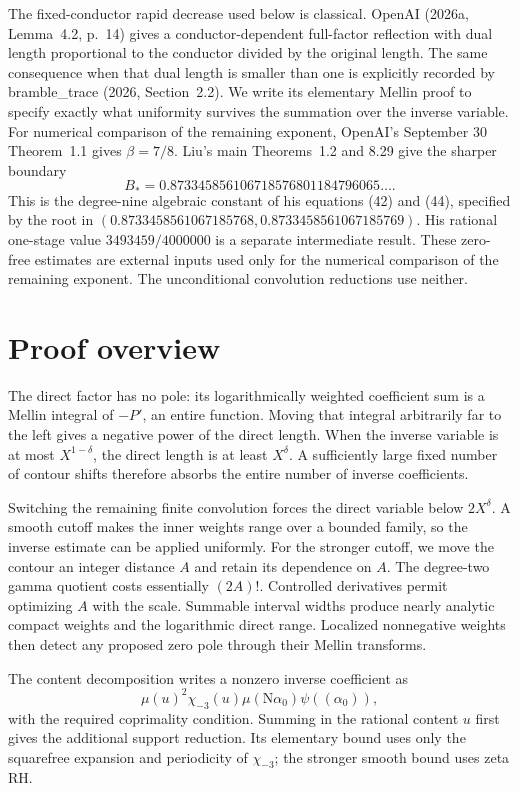 \documentclass[11pt]{article}
\newcommand{\N}{\mathrm N}
\begin{document}
The fixed-conductor rapid decrease used below is classical.
OpenAI (2026a, Lemma~4.2, p.~14) gives a conductor-dependent
full-factor reflection with dual length proportional to the conductor
divided by the original length. The same consequence when that dual
length is smaller than one is explicitly recorded by
bramble\_trace (2026, Section~2.2).
We write its elementary Mellin proof to specify exactly what
uniformity survives the summation over the inverse variable.
For numerical comparison of the remaining exponent, OpenAI's
September 30 Theorem~1.1 gives $\beta=7/8$.
Liu's main Theorems~1.2 and 8.29 give the sharper boundary
\[
 B_*=0.873345856106718576801184796065\ldots.
\]
This is the degree-nine algebraic constant of his equations (42)
and (44), specified by the root in
$(0.8733458561067185768,0.8733458561067185769)$.
His rational one-stage value $3493459/4000000$ is a separate
intermediate result.
These zero-free estimates are external inputs used only for the numerical
comparison of the remaining exponent. The unconditional convolution
reductions use neither.

\section*{Proof overview}
The direct factor has no pole: its logarithmically weighted
coefficient sum is a Mellin integral of $-P'$, an entire function.
Moving that integral arbitrarily far to the left gives a negative
power of the direct length. When the inverse variable is at most
$X^{1-\delta}$, the direct length is at least $X^\delta$.
A sufficiently large fixed number of contour shifts therefore
absorbs the entire number of inverse coefficients.

Switching the remaining finite convolution forces the direct variable
below $2X^\delta$. A smooth cutoff makes the inner weights range
over a bounded family, so the inverse estimate can be applied uniformly.
For the stronger cutoff, we move the contour an integer distance $A$ and retain its dependence on $A$. The degree-two gamma quotient costs essentially $(2A)!$. Controlled derivatives permit optimizing $A$ with the scale. Summable interval widths produce nearly analytic compact weights and the logarithmic direct range. Localized nonnegative weights then detect any proposed zero pole through their Mellin transforms.

The content decomposition writes a nonzero inverse coefficient as
\[
 \mu(u)^2\chi_{-3}(u)\mu(\N\alpha_0)\psi((\alpha_0)),
\]
with the required coprimality condition. Summing in the rational
content $u$ first gives the additional support reduction.
Its elementary bound uses only the squarefree expansion and
periodicity of $\chi_{-3}$; the stronger smooth bound uses zeta RH.
\end{document}
